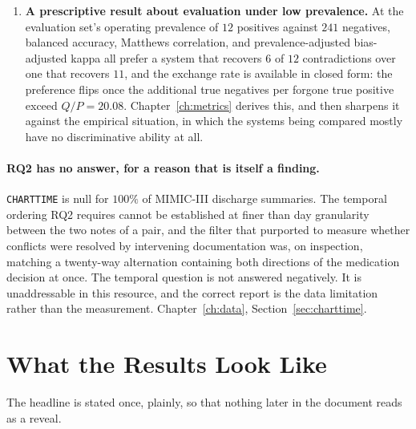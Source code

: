 \begin{enumerate}
\item \textbf{A prescriptive result about evaluation under low prevalence.} At
      the evaluation set's operating prevalence of $12$ positives against $241$
      negatives, balanced accuracy, Matthews correlation, and
      prevalence-adjusted bias-adjusted kappa all prefer a system that recovers
      $6$ of $12$ contradictions over one that recovers $11$, and the exchange
      rate is available in closed form: the preference flips once the additional
      true negatives per forgone true positive exceed $Q/P = 20.08$.
      Chapter~\ref{ch:metrics} derives this, and then sharpens it against the
      empirical situation, in which the systems being compared mostly have no
      discriminative ability at all.
\end{enumerate}

\paragraph{RQ2 has no answer, for a reason that is itself a finding.}
\texttt{CHARTTIME} is null for $100\%$ of MIMIC-III discharge summaries. The
temporal ordering RQ2 requires cannot be established at finer than day
granularity between the two notes of a pair, and the filter that purported to
measure whether conflicts were resolved by intervening documentation was, on
inspection, matching a twenty-way alternation containing both directions of the
medication decision at once. The temporal question is not answered negatively.
It is unaddressable in this resource, and the correct report is the data
limitation rather than the measurement. Chapter~\ref{ch:data},
Section~\ref{sec:charttime}.

\section{What the Results Look Like}
\label{sec:intro-results}

The headline is stated once, plainly, so that nothing later in the document
reads as a reveal.

